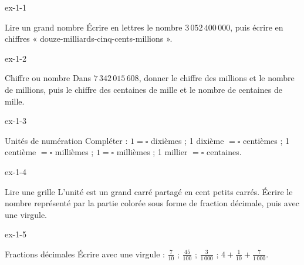 \clearpage{}
\begin{blocLivre}{ex-1-1}\begin{exercice}[1]{Lire un grand nombre}
Écrire en lettres le nombre $3\,052\,400\,000$, puis écrire en chiffres « douze-milliards-cinq-cents-millions ».
\end{exercice}\end{blocLivre}
\begin{blocLivre}{ex-1-2}\begin{exercice}[1]{Chiffre ou nombre}
Dans $7\,342\,015\,608$, donner le chiffre des millions et le nombre de millions, puis le chiffre des centaines de mille et le nombre de centaines de mille.
\end{exercice}\end{blocLivre}
\begin{blocLivre}{ex-1-3}\begin{exercice}[1]{Unités de numération}
Compléter : $1=\square$ dixièmes ; 1 dixième $=\square$ centièmes ; 1 centième $=\square$ millièmes ; $1=\square$ millièmes ; 1 millier $=\square$ centaines.
\end{exercice}\end{blocLivre}
\begin{blocLivre}{ex-1-4}\begin{exercice}[1]{Lire une grille}
L’unité est un grand carré partagé en cent petits carrés. Écrire le nombre représenté par la partie colorée sous forme de fraction décimale, puis avec une virgule.
\label{fig-ex-1-4}
\end{exercice}\end{blocLivre}
\begin{blocLivre}{ex-1-5}\begin{exercice}[1]{Fractions décimales}
Écrire avec une virgule : $\frac7{10}$ ; $\frac{45}{100}$ ; $\frac3{1\,000}$ ; $4+\frac1{10}+\frac7{1\,000}$.
\end{exercice}\end{blocLivre}

